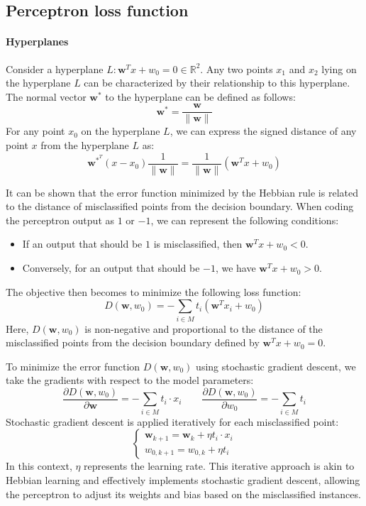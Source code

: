 \subsection{Perceptron loss function}
\paragraph*{Hyperplanes}
Consider a hyperplane $L:\mathbf{w}^T x + w_0 = 0 \in \mathbb{R}^2$. 
Any two points $x_1$ and $x_2$ lying on the hyperplane $L$ can be characterized by their relationship to this hyperplane.
The normal vector $\mathbf{w}^\ast$ to the hyperplane can be defined as follows:
\[\mathbf{w}^\ast = \dfrac{\mathbf{w}}{\|\mathbf{w}\|}\]
For any point $x_0$ on the hyperplane $L$, we can express the signed distance of any point $x$ from the hyperplane $L$ as:
\[\mathbf{w}^{\ast^T} (x - x_0)\dfrac{1}{\|\mathbf{w}\|} = \dfrac{1}{\|\mathbf{w}\|} \left( \mathbf{w}^T x + w_0 \right)\]

It can be shown that the error function minimized by the Hebbian rule is related to the distance of misclassified points from the decision boundary. 
When coding the perceptron output as $1$ or $-1$, we can represent the following conditions:
\begin{itemize}
    \item If an output that should be $1$ is misclassified, then $\mathbf{w}^T x + w_0 < 0$.
    \item Conversely, for an output that should be $-1$, we have $\mathbf{w}^T x + w_0 > 0$.
\end{itemize}
The objective then becomes to minimize the following loss function:
\[D(\mathbf{w}, w_0) = -\sum_{i \in M} t_i (\mathbf{w}^T x_i + w_0)\]
Here, $D(\mathbf{w}, w_0)$ is non-negative and proportional to the distance of the misclassified points from the decision boundary defined by $\mathbf{w}^T x + w_0 = 0$.

To minimize the error function $D(\mathbf{w}, w_0)$ using stochastic gradient descent, we take the gradients with respect to the model parameters:
\[\dfrac{\partial D(\mathbf{w}, w_0)}{\partial \mathbf{w}} = -\sum_{i \in M} t_i \cdot x_i\qquad\dfrac{\partial D(\mathbf{w}, w_0)}{\partial w_0} = -\sum_{i \in M} t_i\]
Stochastic gradient descent is applied iteratively for each misclassified point:
\[\begin{cases}
    \mathbf{w}_{k+1} = \mathbf{w}_k + \eta t_i \cdot x_i \\
    w_{0,k+1} = w_{0,k} + \eta t_i
\end{cases}\]
In this context, $\eta$ represents the learning rate. 
This iterative approach is akin to Hebbian learning and effectively implements stochastic gradient descent, allowing the perceptron to adjust its weights and bias based on the misclassified instances.
